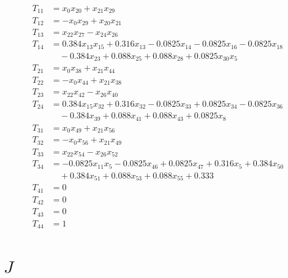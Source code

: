 \documentclass[11pt]{article}
\begin{document}
\begin{align*}
T_{11} &= x_{0} x_{20} + x_{21} x_{29} \\
T_{12} &= - x_{0} x_{29} + x_{20} x_{21} \\
T_{13} &= x_{22} x_{27} - x_{24} x_{26} \\
T_{14} &= 0.384 x_{13} x_{15} + 0.316 x_{13} - 0.0825 x_{14} - 0.0825 x_{16} - 0.0825 x_{18} \\
&\quad - 0.384 x_{23} + 0.088 x_{25} + 0.088 x_{28} + 0.0825 x_{30} x_{5} \\
T_{21} &= x_{0} x_{38} + x_{21} x_{44} \\
T_{22} &= - x_{0} x_{44} + x_{21} x_{38} \\
T_{23} &= x_{22} x_{42} - x_{26} x_{40} \\
T_{24} &= 0.384 x_{15} x_{32} + 0.316 x_{32} - 0.0825 x_{33} + 0.0825 x_{34} - 0.0825 x_{36} \\
&\quad - 0.384 x_{39} + 0.088 x_{41} + 0.088 x_{43} + 0.0825 x_{8} \\
T_{31} &= x_{0} x_{49} + x_{21} x_{56} \\
T_{32} &= - x_{0} x_{56} + x_{21} x_{49} \\
T_{33} &= x_{22} x_{54} - x_{26} x_{52} \\
T_{34} &= - 0.0825 x_{11} x_{5} - 0.0825 x_{46} + 0.0825 x_{47} + 0.316 x_{5} + 0.384 x_{50} \\
&\quad + 0.384 x_{51} + 0.088 x_{53} + 0.088 x_{55} + 0.333 \\
T_{41} &= 0 \\
T_{42} &= 0 \\
T_{43} &= 0 \\
T_{44} &= 1
\end{align*}


\section*{$J$}
\end{document}
